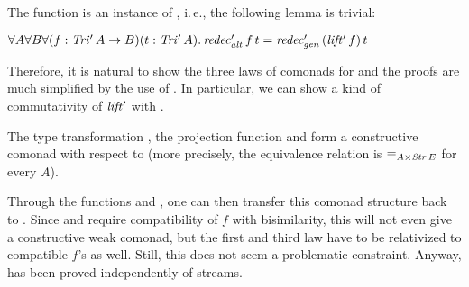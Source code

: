The function \redecSS{} is an instance of \redecSG{}, i.\,e.,
the following lemma is trivial: 
\begin{lemma}
  $\forall A\forall B\forall(f:\mathit{Tri'}\,A\to B)(t:\mathit{Tri'}\,A).\, \mathit{redec'_{alt}}\,f\,t = \mathit{redec'_{gen}}\,(\mathit{lift'}\,f)\,t$
\end{lemma}
\noindent
Therefore, it is natural to show the three laws of comonads for
\redecSS{} and the proofs are much simplified by the use of
\redecSG{}. In particular, we can show a kind of commutativity of $\mathit{lift'}$ with
\redecSS{}. 

\begin{lemma}
  The type transformation \TriS{}, the projection function \topS{}
  and \redecSS{} form a constructive comonad with respect to \EqSt{}
  (more precisely, the equivalence relation is
  $\mathbin{\equiv}_{A\times\mathit{Str}\,E}$ for every $A$).
\end{lemma}
\begin{remark}
  Through the functions \tSR{} and \fSR{}, one can then transfer this
  comonad structure back to \Tri{}.  Since  and
   require compatibility of $f$ with bisimilarity,
  this will not even give a constructive weak comonad, but the first
  and third law have to be relativized to compatible $f$'s as
  well. Still, this does not seem a problematic constraint. Anyway,
   has been proved independently of streams.
\end{remark}


